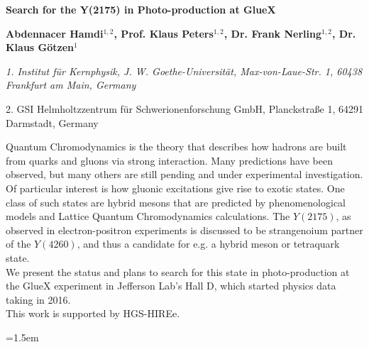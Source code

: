 \documentclass{article}
\begin{document}
\begin{center}
{\Large\bfseries Search for the Y(2175) in Photo-production at GlueX \par}
\vspace{3ex}
{\bfseries Abdennacer Hamdi$^{1,2}$, Prof. Klaus Peters$^{1,2}$, Dr. Frank Nerling$^{1,2}$, Dr. Klaus Götzen$^{1}$ \par}
{\footnotesize\itshape
1. Institut für Kernphysik, J. W. Goethe-Universität, Max-von-Laue-Str. 1, 60438 Frankfurt am Main, Germany \par
2. GSI Helmholtzzentrum für Schwerionenforschung GmbH, Planckstraße 1, 64291 Darmstadt, Germany \par}
\vspace{3ex}
\end{center}
Quantum Chromodynamics is the theory that describes how hadrons are built from quarks and gluons via strong 
interaction. Many predictions have been observed, but many others are still pending and under experimental 
investigation.
Of particular interest is how gluonic excitations give rise to exotic states. One class of such states are hybrid
mesons that are predicted by phenomenological models and Lattice Quantum Chromodynamics calculations.
The $Y(2175)$, as observed in electron-positron experiments is discussed to be strangenoium partner of
the $Y(4260)$, and thus a candidate for e.g. a hybrid meson or tetraquark state.\\
We present the status and plans to search for this state in photo-production at the GlueX experiment
in Jefferson Lab’s Hall D, which started physics data taking in 2016.\\
This work is supported by HGS-HIREe.

\setlength\parindent{0pt}\vspace{2ex}

\footnotesize


\hangindent=1.5em


\end{document}
